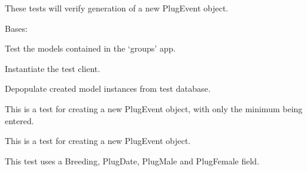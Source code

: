\documentclass[letterpaper,10pt,english]{sphinxmanual}
\begin{document}
\begin{fulllineitems}
These tests will verify generation of a new PlugEvent object.

\begin{fulllineitems}
\label{api:timed_mating.tests.GroupsModelTests}
Bases: 

Test the models contained in the `groups' app.

\begin{fulllineitems}
\label{api:timed_mating.tests.GroupsModelTests.setUp}
Instantiate the test client.

\end{fulllineitems}


\begin{fulllineitems}
\label{api:timed_mating.tests.GroupsModelTests.tearDown}
Depopulate created model instances from test database.

\end{fulllineitems}


\begin{fulllineitems}
\label{api:timed_mating.tests.GroupsModelTests.test_create_plugevent_minimal}
This is a test for creating a new PlugEvent object, with only the minimum being entered.

\end{fulllineitems}


\begin{fulllineitems}
\label{api:timed_mating.tests.GroupsModelTests.test_create_plugevent_most_fields}
This is a test for creating a new PlugEvent object.

This test uses a Breeding, PlugDate, PlugMale and PlugFemale field.


\end{fulllineitems}
\end{fulllineitems}
\end{fulllineitems}
\end{document}
